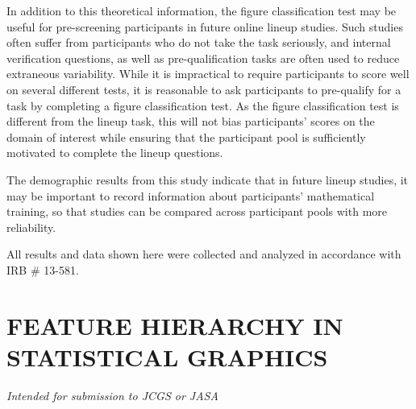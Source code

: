 \documentclass[11pt]{isuthesis}\usepackage[]{graphicx}\usepackage[]{color}
\begin{document}
In addition to this theoretical information, the figure classification test may be useful for pre-screening participants in future online lineup studies.
Such studies often suffer from participants who do not take the task seriously, and internal verification questions, as well as pre-qualification tasks are often used to reduce extraneous variability.
While it is impractical to require participants to score well on several different tests, it is reasonable to ask participants to pre-qualify for a task by completing a figure classification test.
As the figure classification test is different from the lineup task, this will not bias participants' scores on the domain of interest while ensuring that the participant pool is sufficiently motivated to complete the lineup questions.

The demographic results from this study indicate that in future lineup studies, it may be important to record information about participants' mathematical training, so that studies can be compared across participant pools with more reliability. 

All results and data shown here were collected and analyzed in accordance with IRB \# 13-581.

	\chapter{FEATURE HIERARCHY IN STATISTICAL GRAPHICS}\label{featurehierarchy}


\graphicspath{{Figure/FeatureHierarchy/}{Images/FeatureHierarchy/}}
\renewcommand{\floatpagefraction}{.99}


\noindent\hfil\textit{Intended for submission to JCGS or JASA}\hfil
\end{document}
